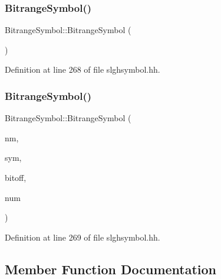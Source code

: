 \subsubsection{\texorpdfstring{BitrangeSymbol()}{BitrangeSymbol()}\hspace{0.1cm}{\footnotesize\ttfamily [1/2]}}
{\footnotesize\ttfamily Bitrange\+Symbol\+::\+Bitrange\+Symbol (\begin{DoxyParamCaption}\item[{void}]{ }\end{DoxyParamCaption})\hspace{0.3cm}{\ttfamily [inline]}}



Definition at line 268 of file slghsymbol.\+hh.

\mbox{\label{class_bitrange_symbol_a535c5e6e47b0a2eca15c25799426220d}} 
\subsubsection{\texorpdfstring{BitrangeSymbol()}{BitrangeSymbol()}\hspace{0.1cm}{\footnotesize\ttfamily [2/2]}}
{\footnotesize\ttfamily Bitrange\+Symbol\+::\+Bitrange\+Symbol (\begin{DoxyParamCaption}\item[{const string \&}]{nm,  }\item[{\mbox{\hyperlink{class_varnode_symbol}{Varnode\+Symbol}} $\ast$}]{sym,  }\item[{uint4}]{bitoff,  }\item[{uint4}]{num }\end{DoxyParamCaption})\hspace{0.3cm}{\ttfamily [inline]}}



Definition at line 269 of file slghsymbol.\+hh.



\subsection{Member Function Documentation}
\mbox{\label{class_bitrange_symbol_ab47d00ea2079c1cf7f12cbb648e8e08b}} 
